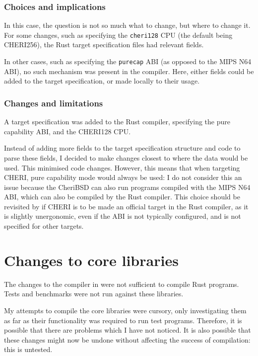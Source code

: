 \documentclass[dissertation.tex]{subfiles}
\begin{document}
\subsubsection{Choices and implications}
In this case, the question is not so much what to change, but where to
change it.
For some changes, such as specifying the \texttt{cheri128} CPU (the
default being CHERI256), the Rust target specification files had
relevant fields.

In other cases, such as specifying the \texttt{purecap} ABI (as opposed
to the MIPS N64 ABI), no such mechanism was present in the compiler.
Here, either fields could be added to the target specification, or made
locally to their usage.


\subsubsection{Changes and limitations}
A target specification was added to the Rust compiler, specifying the
pure capability ABI, and the CHERI128 CPU.

Instead of adding more fields to the target specification structure and
code to parse these fields, I decided to make changes closest to where
the data would be used.
This minimised code changes.
However, this means that when targeting CHERI, pure capability mode
would always be used: I do not consider this an issue because the
CheriBSD can also run programs compiled with the MIPS N64 ABI, which can
also be compiled by the Rust compiler.
This choice should be revisited by if CHERI is to be made an official
target in the Rust compiler, as it is slightly unergonomic, even if the
ABI is not typically configured, and is not specified for other targets.


\section{Changes to core libraries}
\label{sec:impl-div-lib}

The changes to the compiler in  were not
sufficient to compile Rust programs.
Tests and benchmarks were not run against these libraries.

My attempts to compile the core libraries were cursory, only
investigating them as far as their functionality was required to run
test programs.
Therefore, it is possible that there are problems which I have not
noticed.
It is also possible that these changes might now be undone without
affecting the success of compilation: this is untested.
\end{document}
